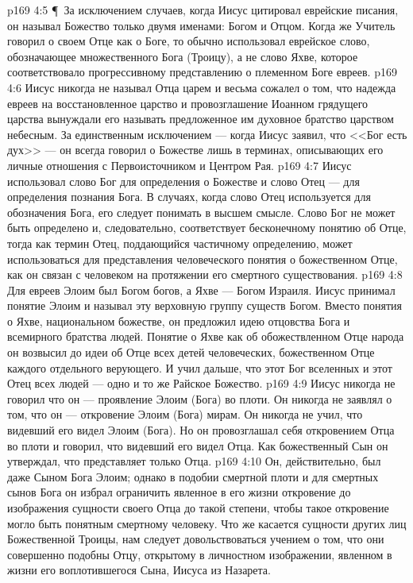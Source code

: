 \vs p169 4:5 \P\ За исключением случаев, когда Иисус цитировал еврейские писания, он называл Божество только двумя именами: Богом и Отцом. Когда же Учитель говорил о своем Отце как о Боге, то обычно использовал еврейское слово, обозначающее множественного Бога (Троицу), а не слово Яхве, которое соответствовало прогрессивному представлению о племенном Боге евреев.
\vs p169 4:6 Иисус никогда не называл Отца царем и весьма сожалел о том, что надежда евреев на восстановленное царство и провозглашение Иоанном грядущего царства вынуждали его называть предложенное им духовное братство царством небесным. За единственным исключением --- когда Иисус заявил, что <<Бог есть дух>> --- он всегда говорил о Божестве лишь в терминах, описывающих его личные отношения с Первоисточником и Центром Рая.
\vs p169 4:7 Иисус использовал слово Бог для определения  о Божестве и слово Отец --- для определения  познания Бога. В случаях, когда слово Отец используется для обозначения Бога, его следует понимать в высшем смысле. Слово Бог не может быть определено и, следовательно, соответствует бесконечному понятию об Отце, тогда как термин Отец, поддающийся частичному определению, может использоваться для представления человеческого понятия о божественном Отце, как он связан с человеком на протяжении его смертного существования.
\vs p169 4:8 Для евреев Элоим был Богом богов, а Яхве --- Богом Израиля. Иисус принимал понятие Элоим и называл эту верховную группу существ Богом. Вместо понятия о Яхве, национальном божестве, он предложил идею отцовства Бога и всемирного братства людей. Понятие о Яхве как об обожествленном Отце народа он возвысил до идеи об Отце всех детей человеческих, божественном Отце каждого отдельного верующего. И учил дальше, что этот Бог вселенных и этот Отец всех людей --- одно и то же Райское Божество.
\vs p169 4:9 Иисус никогда не говорил что он --- проявление Элоим (Бога) во плоти. Он никогда не заявлял о том, что он --- откровение Элоим (Бога) мирам. Он никогда не учил, что видевший его видел Элоим (Бога). Но он провозглашал себя откровением Отца во плоти и говорил, что видевший его видел Отца. Как божественный Сын он утверждал, что представляет только Отца.
\vs p169 4:10 Он, действительно, был даже Сыном Бога Элоим; однако в подобии смертной плоти и для смертных сынов Бога он избрал ограничить явленное в его жизни откровение до изображения сущности своего Отца до такой степени, чтобы такое откровение могло быть понятным смертному человеку. Что же касается сущности других лиц Божественной Троицы, нам следует довольствоваться учением о том, что они совершенно подобны Отцу, открытому в личностном изображении, явленном в жизни его воплотившегося Сына, Иисуса из Назарета.
